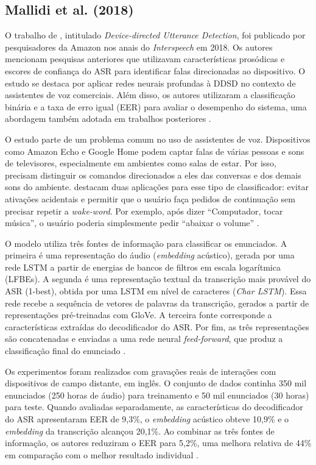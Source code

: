 \documentclass[
    12pt,                %
    openright,           %
    oneside,             %
    a4paper,             %
    english,             %
    brazil               %
]{abntex2}
\begin{document}

\subsection{Mallidi et al. (2018)}

O trabalho de , intitulado \textit{Device-directed Utterance Detection}, foi publicado por pesquisadores da Amazon nos anais do \textit{Interspeech} em 2018. Os autores mencionam pesquisas anteriores que utilizavam características prosódicas e escores de confiança do ASR para identificar falas direcionadas ao dispositivo. O estudo se destaca por aplicar redes neurais profundas à DDSD no contexto de assistentes de voz comerciais. Além disso, os autores utilizaram a classificação binária e a taxa de erro igual (EER) para avaliar o desempenho do sistema, uma abordagem também adotada em trabalhos posteriores \cite{Wagner2024}.

O estudo parte de um problema comum no uso de assistentes de voz. Dispositivos como Amazon Echo e Google Home podem captar falas de várias pessoas e sons de televisores, especialmente em ambientes como salas de estar. Por isso, precisam distinguir os comandos direcionados a eles das conversas e dos demais sons do ambiente.  destacam duas aplicações para esse tipo de classificador: evitar ativações acidentais e permitir que o usuário faça pedidos de continuação sem precisar repetir a \textit{wake-word}. Por exemplo, após dizer ``Computador, tocar música'', o usuário poderia simplesmente pedir ``abaixar o volume'' \cite{Mallidi2018}.

O modelo utiliza três fontes de informação para classificar os enunciados. A primeira é uma representação do áudio (\textit{embedding} acústico), gerada por uma rede LSTM a partir de energias de bancos de filtros em escala logarítmica (LFBEs). A segunda é uma representação textual da transcrição mais provável do ASR (1-best), obtida por uma LSTM em nível de caracteres (\textit{Char LSTM}). Essa rede recebe a sequência de vetores de palavras da transcrição, gerados a partir de representações pré-treinadas com GloVe. A terceira fonte corresponde a características extraídas do decodificador do ASR. Por fim, as três representações são concatenadas e enviadas a uma rede neural \textit{feed-forward}, que produz a classificação final do enunciado \cite{Mallidi2018}.

Os experimentos foram realizados com gravações reais de interações com dispositivos de campo distante, em inglês. O conjunto de dados continha 350 mil enunciados (250 horas de áudio) para treinamento e 50 mil enunciados (30 horas) para teste. Quando avaliadas separadamente, as características do decodificador do ASR apresentaram EER de 9,3\%, o \textit{embedding} acústico obteve 10,9\% e o \textit{embedding} da transcrição alcançou 20,1\%. Ao combinar as três fontes de informação, os autores reduziram o EER para 5,2\%, uma melhora relativa de 44\% em comparação com o melhor resultado individual \cite{Mallidi2018}.
\end{document}
